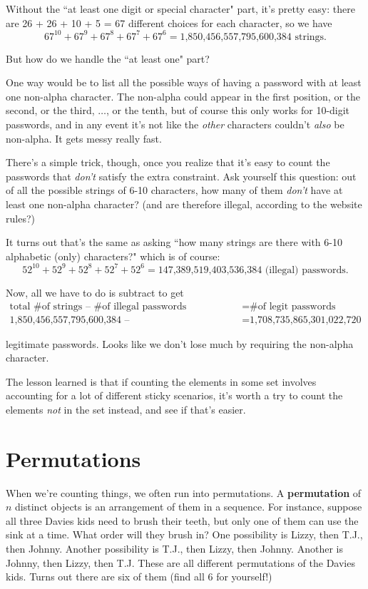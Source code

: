 Without the ``at least one digit or special character" part, it's pretty
easy: there are 26 + 26 + 10 + 5 = 67 different choices for each character,
so we have
\[
67^{10} + 67^9 + 67^8 + 67^7 + 67^6 = \text{1,850,456,557,795,600,384
strings}.
\]

But how do we handle the ``at least one" part?

One way would be to list all the possible ways of having a password with at
least one non-alpha character. The non-alpha could appear in the first
position, or the second, or the third, $\dots$, or the tenth, but of course
this only works for 10-digit passwords, and in any event it's not like the
\textit{other} characters couldn't \textit{also} be non-alpha. It gets
messy really fast.

There's a simple trick, though, once you realize that it's easy to count
the passwords that \textit{don't} satisfy the extra constraint. Ask
yourself this question: out of all the possible strings of 6-10 characters,
how many of them \textit{don't} have at least one non-alpha character? (and
are therefore illegal, according to the website rules?)

It turns out that's the same as asking ``how many strings are there with
6-10 alphabetic (only) characters?" which is of course:
\footnotesize
\[
52^{10} + 52^9 + 52^8 + 52^7 + 52^6 = \text{147,389,519,403,536,384
(illegal) passwords}.
\]
\normalsize

Now, all we have to do is subtract to get
{\footnotesize
\begin{align*}
\text{total \# of strings -- \# of illegal passwords} & = \text{\# of legit passwords} \\
\text{1,850,456,557,795,600,384 -- 147,389,519,403,536,384} &= \text{1,708,735,865,301,022,720}
\end{align*}
}
\vspace{-.15in}

legitimate passwords. Looks like we don't lose much by requiring the
non-alpha character.

The lesson learned is that if counting the elements in some set involves
accounting for a lot of different sticky scenarios, it's worth a try to
count the elements \textit{not} in the set instead, and see if that's
easier.


\section{Permutations}

When we're counting things, we often run into permutations. A
\textbf{permutation} of $n$ distinct objects is an arrangement of them in a
sequence. For instance, suppose all three Davies kids need to brush their
teeth, but only one of them can use the sink at a time. What order will
they brush in? One possibility is Lizzy, then T.J., then Johnny. Another
possibility is T.J., then Lizzy, then Johnny. Another is Johnny, then
Lizzy, then T.J. These are all different permutations of the Davies kids.
Turns out there are six of them (find all 6 for yourself!)

